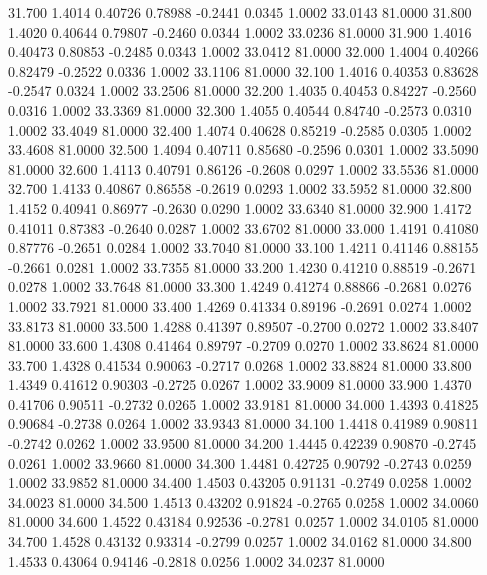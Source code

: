   31.700   1.4014   0.40726   0.78988  -0.2441   0.0345   1.0002  33.0143  81.0000
  31.800   1.4020   0.40644   0.79807  -0.2460   0.0344   1.0002  33.0236  81.0000
  31.900   1.4016   0.40473   0.80853  -0.2485   0.0343   1.0002  33.0412  81.0000
  32.000   1.4004   0.40266   0.82479  -0.2522   0.0336   1.0002  33.1106  81.0000
  32.100   1.4016   0.40353   0.83628  -0.2547   0.0324   1.0002  33.2506  81.0000
  32.200   1.4035   0.40453   0.84227  -0.2560   0.0316   1.0002  33.3369  81.0000
  32.300   1.4055   0.40544   0.84740  -0.2573   0.0310   1.0002  33.4049  81.0000
  32.400   1.4074   0.40628   0.85219  -0.2585   0.0305   1.0002  33.4608  81.0000
  32.500   1.4094   0.40711   0.85680  -0.2596   0.0301   1.0002  33.5090  81.0000
  32.600   1.4113   0.40791   0.86126  -0.2608   0.0297   1.0002  33.5536  81.0000
  32.700   1.4133   0.40867   0.86558  -0.2619   0.0293   1.0002  33.5952  81.0000
  32.800   1.4152   0.40941   0.86977  -0.2630   0.0290   1.0002  33.6340  81.0000
  32.900   1.4172   0.41011   0.87383  -0.2640   0.0287   1.0002  33.6702  81.0000
  33.000   1.4191   0.41080   0.87776  -0.2651   0.0284   1.0002  33.7040  81.0000
  33.100   1.4211   0.41146   0.88155  -0.2661   0.0281   1.0002  33.7355  81.0000
  33.200   1.4230   0.41210   0.88519  -0.2671   0.0278   1.0002  33.7648  81.0000
  33.300   1.4249   0.41274   0.88866  -0.2681   0.0276   1.0002  33.7921  81.0000
  33.400   1.4269   0.41334   0.89196  -0.2691   0.0274   1.0002  33.8173  81.0000
  33.500   1.4288   0.41397   0.89507  -0.2700   0.0272   1.0002  33.8407  81.0000
  33.600   1.4308   0.41464   0.89797  -0.2709   0.0270   1.0002  33.8624  81.0000
  33.700   1.4328   0.41534   0.90063  -0.2717   0.0268   1.0002  33.8824  81.0000
  33.800   1.4349   0.41612   0.90303  -0.2725   0.0267   1.0002  33.9009  81.0000
  33.900   1.4370   0.41706   0.90511  -0.2732   0.0265   1.0002  33.9181  81.0000
  34.000   1.4393   0.41825   0.90684  -0.2738   0.0264   1.0002  33.9343  81.0000
  34.100   1.4418   0.41989   0.90811  -0.2742   0.0262   1.0002  33.9500  81.0000
  34.200   1.4445   0.42239   0.90870  -0.2745   0.0261   1.0002  33.9660  81.0000
  34.300   1.4481   0.42725   0.90792  -0.2743   0.0259   1.0002  33.9852  81.0000
  34.400   1.4503   0.43205   0.91131  -0.2749   0.0258   1.0002  34.0023  81.0000
  34.500   1.4513   0.43202   0.91824  -0.2765   0.0258   1.0002  34.0060  81.0000
  34.600   1.4522   0.43184   0.92536  -0.2781   0.0257   1.0002  34.0105  81.0000
  34.700   1.4528   0.43132   0.93314  -0.2799   0.0257   1.0002  34.0162  81.0000
  34.800   1.4533   0.43064   0.94146  -0.2818   0.0256   1.0002  34.0237  81.0000
